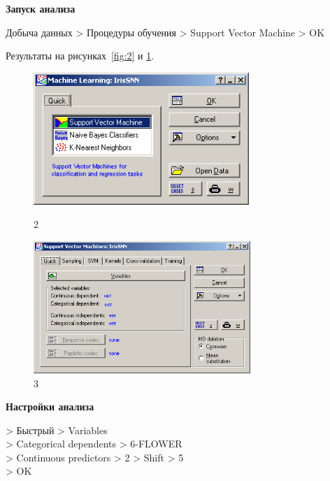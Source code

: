 \newpage

\begin{center}
  \textbf{Запуск анализа}
\end{center}

Добыча данных > Процедуры обучения > Support Vector Machine > OK

Результаты на рисунках~\ref{fig:2} и \ref{fig:3}.

\begin{figure}[!h]
  \centering

  \begin{minipage}{0.49\textwidth}
    \centering

    \includegraphics[height=5cm]
    {inc/ex_2.PNG}

    \caption{2}

    \label{fig:2}
  \end{minipage}
  \begin{minipage}{0.49\textwidth}
    \centering

    \includegraphics[height=5cm]
    {inc/ex_3.PNG}

    \caption{3}

    \label{fig:3}
  \end{minipage}
\end{figure}

\begin{center}
  \textbf{Настройки анализа}
\end{center}

> Быстрый > Variables \\
> Categorical dependents > 6-FLOWER \\
> Continuous predictors > 2 > Shift > 5 \\
> OK


